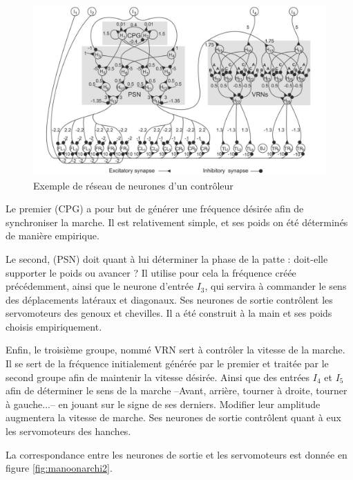 \documentclass{tnreport}
\begin{document}
\begin{figure}[h]
    \centering
    \includegraphics[width =\textwidth]{figures/mannoonarchi}
    \caption{Exemple de réseau de neurones d'un contrôleur \cite{manoonpong_sensor-driven_2008}}
    \label{fig:manoonarchi}
\end{figure}

Le premier (\gls{CPG}) a pour but de générer une fréquence désirée afin de synchroniser la marche. Il est relativement simple, et ses poids on été déterminés de manière empirique. 

Le second, (\gls{PSN}) doit quant à lui déterminer la phase de la patte : doit-elle supporter le poids ou avancer ? Il utilise pour cela la fréquence créée précédemment, ainsi que le neurone d'entrée $I_3$, qui servira à commander le sens des déplacements latéraux et diagonaux. Ses neurones de sortie contrôlent les servomoteurs des genoux et chevilles. Il a été construit à la main et ses poids choisis empiriquement. 

Enfin, le troisième groupe, nommé \gls{VRN} sert à contrôler la vitesse de la marche. Il se sert de la fréquence initialement générée par le premier et traitée par le second groupe afin de maintenir la vitesse désirée. Ainsi que des entrées $I_4$ et $I_5$ afin de déterminer le sens de la marche --Avant, arrière, tourner à droite, tourner à gauche...-- en jouant sur le signe de ses derniers. Modifier leur amplitude augmentera la vitesse de marche. Ses neurones de sortie contrôlent quant à eux les servomoteurs des hanches. 

La correspondance entre les neurones de sortie et les servomoteurs est donnée en figure \ref{fig:manoonarchi2}. 
\end{document}
